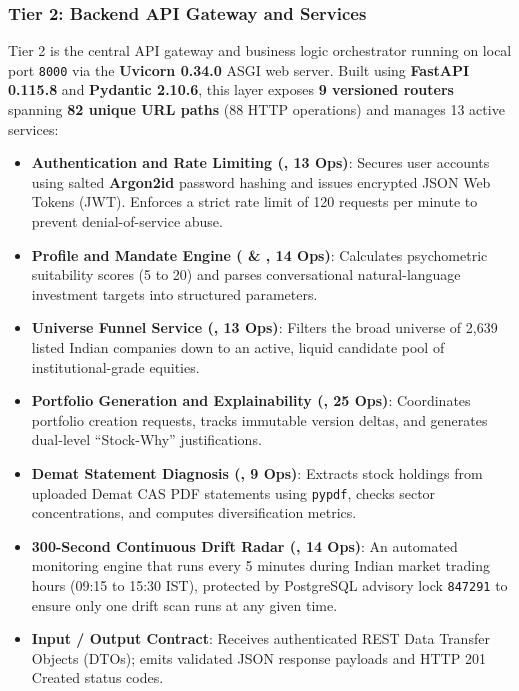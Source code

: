 \subsubsection{Tier 2: Backend API Gateway and Services}
Tier 2 is the central API gateway and business logic orchestrator running on local port \texttt{8000} via the \textbf{Uvicorn 0.34.0} ASGI web server. Built using \textbf{FastAPI 0.115.8} and \textbf{Pydantic 2.10.6}, this layer exposes \textbf{9 versioned routers} spanning \textbf{82 unique URL paths} (88 HTTP operations) and manages 13 active services:
\begin{itemize}
    \item \textbf{Authentication and Rate Limiting (, 13 Ops)}: Secures user accounts using salted \textbf{Argon2id} password hashing and issues encrypted JSON Web Tokens (JWT). Enforces a strict rate limit of 120 requests per minute to prevent denial-of-service abuse.
    \item \textbf{Profile and Mandate Engine ( \& , 14 Ops)}: Calculates psychometric suitability scores (5 to 20) and parses conversational natural-language investment targets into structured parameters.
    \item \textbf{Universe Funnel Service (, 13 Ops)}: Filters the broad universe of 2,639 listed Indian companies down to an active, liquid candidate pool of institutional-grade equities.
    \item \textbf{Portfolio Generation and Explainability (, 25 Ops)}: Coordinates portfolio creation requests, tracks immutable version deltas, and generates dual-level ``Stock-Why'' justifications.
    \item \textbf{Demat Statement Diagnosis (, 9 Ops)}: Extracts stock holdings from uploaded Demat CAS PDF statements using \texttt{pypdf}, checks sector concentrations, and computes diversification metrics.
    \item \textbf{300-Second Continuous Drift Radar (, 14 Ops)}: An automated monitoring engine that runs every 5 minutes during Indian market trading hours (09:15 to 15:30 IST), protected by PostgreSQL advisory lock \texttt{847291} to ensure only one drift scan runs at any given time.
    \item \textbf{Input / Output Contract}: Receives authenticated REST Data Transfer Objects (DTOs); emits validated JSON response payloads and HTTP 201 Created status codes.
\end{itemize}

